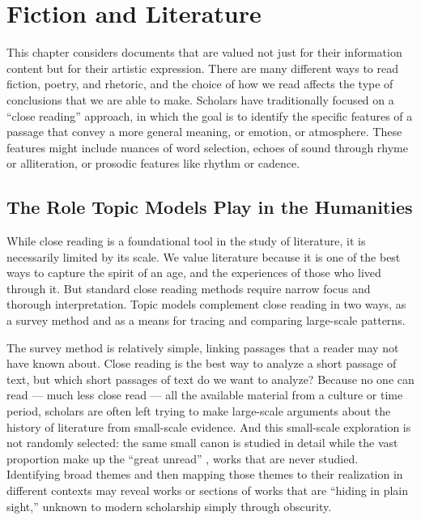 
\chapter{Fiction and Literature}

\label{ch:fiction}

This chapter considers documents that are valued not just for their information content but for their artistic expression.
There are many different ways to read fiction, poetry, and rhetoric, and the choice of how we read affects the type of conclusions that we are able to make.
Scholars have traditionally focused on a ``close reading'' approach, in which the goal is to identify the specific features of a passage that convey a more general meaning, or emotion, or atmosphere.
These features might include nuances of word  selection, echoes of sound through rhyme or alliteration, or prosodic features like rhythm or cadence.

\section{The Role Topic Models Play in the Humanities}

While close reading is a foundational tool in the study of literature, it is necessarily limited by its scale. 
We value literature because it is one of the best ways to capture the spirit of an age, and the experiences of those who lived through it. But standard close reading methods require narrow focus and thorough interpretation.
Topic models complement close reading in two ways, as a survey method and as a means for tracing and comparing large-scale patterns.

The survey method is relatively simple, linking passages that a reader may not have known about.
Close reading is the best way to analyze a short passage of text, but which short passages of text do we want to analyze?
Because no one can read --- much less close read --- all the available material from a culture or time period, scholars are often left trying to make large-scale arguments about the history of literature from small-scale evidence. And this small-scale exploration is not randomly selected: the same small canon is studied in detail while the vast proportion make up the ``great unread'' \citep{moretti-00}, works that are never studied.
Identifying broad themes and then mapping those themes to their realization in different contexts may reveal works or sections of works that are ``hiding in plain sight,'' unknown to modern scholarship simply through obscurity.

